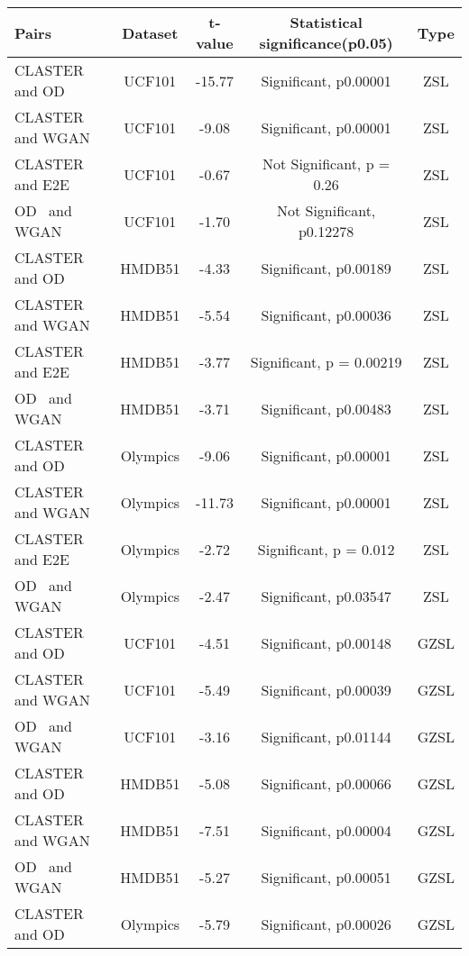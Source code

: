 \documentclass[runningheads]{llncs}
\begin{document}
\begin{table*}
\begin{center}
\begin{tabular}{|l|c|c|c|c|}
\hline
Pairs & Dataset & t-value & Statistical significance(p0.05) & Type\\
\hline\hline
CLASTER and OD~\cite{OD} & UCF101 & -15.77 & Significant, p0.00001 & ZSL\\
CLASTER and WGAN~\cite{clswgan} & UCF101 & -9.08 & Significant, p0.00001 & ZSL\\
CLASTER and E2E~\cite{e2e} & UCF101 & -0.67 & Not Significant, p = 0.26 & ZSL\\
OD~\cite{OD} and WGAN~\cite{clswgan} & UCF101 & -1.70 & Not Significant, p0.12278 & ZSL\\
\hline
CLASTER and OD~\cite{OD} & HMDB51 & -4.33 & Significant, p0.00189 & ZSL\\
CLASTER and WGAN~\cite{clswgan} & HMDB51 & -5.54 & Significant, p0.00036 & ZSL\\
CLASTER and E2E~\cite{e2e} & HMDB51 & -3.77 & Significant, p = 0.00219 & ZSL\\
OD~\cite{OD} and WGAN~\cite{clswgan} & HMDB51 & -3.71 & Significant, p0.00483 & ZSL\\
\hline
CLASTER and OD~\cite{OD} & Olympics & -9.06 & Significant, p0.00001 & ZSL\\
CLASTER and WGAN~\cite{clswgan} & Olympics & -11.73 & Significant, p0.00001 & ZSL\\
CLASTER and E2E~\cite{e2e} & Olympics & -2.72 & Significant, p = 0.012 & ZSL\\
OD~\cite{OD} and WGAN~\cite{clswgan} & Olympics & -2.47 & Significant, p0.03547 & ZSL\\
\hline
CLASTER and OD~\cite{OD} & UCF101 & -4.51 & Significant, p0.00148 & GZSL\\
CLASTER and WGAN~\cite{clswgan} & UCF101 & -5.49 & Significant, p0.00039 & GZSL\\
OD~\cite{OD} and WGAN~\cite{clswgan} & UCF101 & -3.16 & Significant, p0.01144 & GZSL\\
\hline
CLASTER and OD~\cite{OD} & HMDB51 & -5.08 & Significant, p0.00066 & GZSL\\
CLASTER and WGAN~\cite{clswgan} & HMDB51 & -7.51 & Significant, p0.00004 & GZSL\\
OD~\cite{OD} and WGAN~\cite{clswgan} & HMDB51 & -5.27 & Significant, p0.00051 & GZSL\\
\hline
CLASTER and OD~\cite{OD} & Olympics & -5.79 & Significant, p0.00026 & GZSL\\

\end{tabular}
\end{center}
\end{table*}
\end{document}
